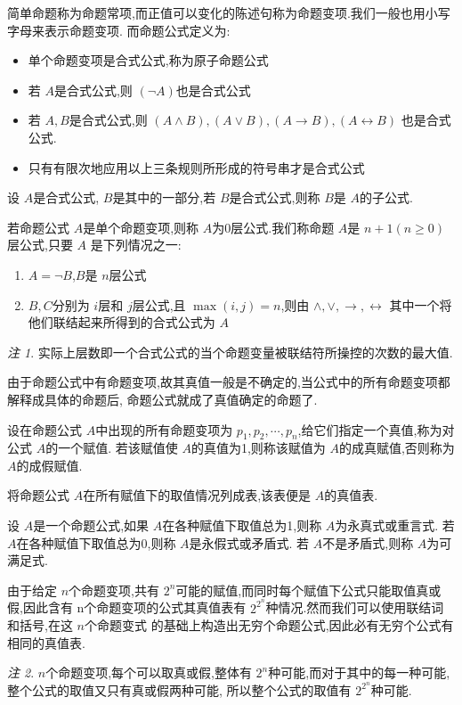 \documentclass[a4paper,11pt]{article}%
\theoremstyle{remark}
\newtheorem*{remark}{注}
\theoremstyle{remark}
\theoremstyle{definition}
\theoremstyle{definition}
\theoremstyle{plain}
\begin{document}
简单命题称为命题常项,而正值可以变化的陈述句称为命题变项.我们一般也用小写字母来表示命题变项.
而命题公式定义为:
\begin{itemize}
    \item 单个命题变项是合式公式,称为原子命题公式
    \item 若 $A$是合式公式,则 $(\lnot A)$也是合式公式
    \item 若 $A,B$是合式公式,则 $(A\land B),(A\lor B),(A\rightarrow B),(A\leftrightarrow B)$
    也是合式公式.
    \item 只有有限次地应用以上三条规则所形成的符号串才是合式公式
\end{itemize}
设 $A$是合式公式, $B$是其中的一部分,若 $B$是合式公式,则称 $B$是 $A$的子公式.

若命题公式 $A$是单个命题变项,则称 $A$为0层公式.我们称命题 $A$是 $n+1(n\geq 0)$层公式,只要 $A$
是下列情况之一:
\begin{enumerate}
    \item $A=\lnot B$,$B$是 $n$层公式
    \item $B,C$分别为 $i$层和 $j$层公式,且 $\max(i,j)=n$,则由 $\land,\lor,\rightarrow,\leftrightarrow$
    其中一个将他们联结起来所得到的合式公式为 $A$
\end{enumerate}
\begin{remark}
    实际上层数即一个合式公式的当个命题变量被联结符所操控的次数的最大值.
\end{remark}
由于命题公式中有命题变项,故其真值一般是不确定的,当公式中的所有命题变项都解释成具体的命题后,
命题公式就成了真值确定的命题了.

设在命题公式 $A$中出现的所有命题变项为 $p_1,p_2,\cdots,p_n$,给它们指定一个真值,称为对公式 $A$的一个赋值.
若该赋值使 $A$的真值为1,则称该赋值为 $A$的成真赋值,否则称为 $A$的成假赋值.

将命题公式 $A$在所有赋值下的取值情况列成表,该表便是 $A$的真值表.

设 $A$是一个命题公式,如果 $A$在各种赋值下取值总为1,则称 $A$为永真式或重言式.
若 $A$在各种赋值下取值总为0,则称 $A$是永假式或矛盾式.
若 $A$不是矛盾式,则称 $A$为可满足式.

由于给定 $n$个命题变项,共有 $2^n$可能的赋值,而同时每个赋值下公式只能取值真或假,因此含有
n个命题变项的公式其真值表有 $2^{2^n}$种情况.然而我们可以使用联结词和括号,在这 $n$个命题变式
的基础上构造出无穷个命题公式,因此必有无穷个公式有相同的真值表.
\begin{remark}
    $n$个命题变项,每个可以取真或假,整体有 $2^n$种可能,而对于其中的每一种可能,整个公式的取值又只有真或假两种可能,
    所以整个公式的取值有 $2^{2^n}$种可能.
\end{remark}
\end{document}
